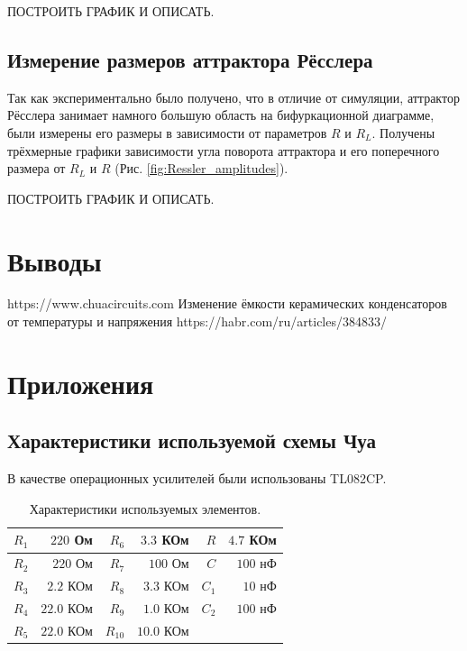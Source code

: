 \documentclass[12pt]{article}
\begin{document}
ПОСТРОИТЬ ГРАФИК И ОПИСАТЬ. 

\subsection*{Измерение размеров аттрактора Рёсслера}
Так как экспериментально было получено, что в отличие от симуляции, аттрактор 
Рёсслера занимает намного большую область на бифуркационной диаграмме, были измерены 
его размеры в зависимости от параметров $R$ и $R_L$. Получены трёхмерные графики зависимости угла поворота аттрактора и 
его поперечного размера от $R_L$ и $R$ (Рис. \ref{fig:Ressler_amplitudes}).

ПОСТРОИТЬ ГРАФИК И ОПИСАТЬ. 


\section*{Выводы}

\begin{thebibliography}{9}
	https://www.chuacircuits.com
	Изменение ёмкости керамических конденсаторов от температуры и напряжения https://habr.com/ru/articles/384833/
\end{thebibliography}

\section*{Приложения}
\subsection*{Характеристики используемой схемы Чуа}
В качестве операционных усилителей были использованы TL082CP.
\begin{table}[H]
	\centering
	\begin{tabular}{|r|r|r|r|r|r|}
		\hline
		$R_1$ & $220$ Ом   & $R_6$  & $3.3$ КОм  & $R$   & $4.7$ КОм \\ \hline
		$R_2$ & $220$ Ом   & $R_7$  & $100$ Ом   & $C$   & $100$ нФ  \\ \hline
		$R_3$ & $2.2$ КОм  & $R_8$  & $3.3$ КОм  & $C_1$ & $10$ нФ   \\ \hline
		$R_4$ & $22.0$ КОм & $R_9$  & $1.0$ КОм  & $C_2$ & $100$ нФ  \\ \hline
		$R_5$ & $22.0$ КОм & $R_{10}$ & $10.0$ КОм &       &           \\ \hline
	\end{tabular}
	\caption{Характеристики используемых элементов.}
	\label{tab:curcuit_chars}
\end{table}
\end{document}
